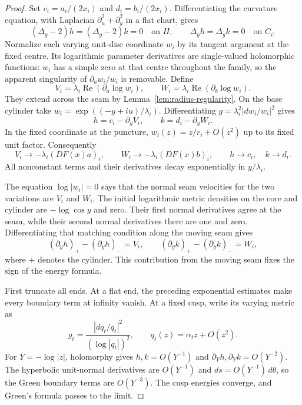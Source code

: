 \documentclass[11pt,a4paper]{article}
\theoremstyle{definition}
\begin{document}
\begin{proof}
Set $c_i=a_i/(2x_i)$ and $d_i=b_i/(2x_i)$. Differentiating the curvature equation, with Laplacian $\partial_u^2+\partial_y^2$ in a flat chart, gives
\[
 (\Delta_g-2)h=(\Delta_g-2)k=0\quad\text{on }H,
 \qquad \Delta_g h=\Delta_g k=0\quad\text{on }C_i.
\]
Normalize each varying unit-disc coordinate $w_i$ by its tangent argument at the fixed centre. Its logarithmic parameter derivatives are single-valued holomorphic functions: $w_i$ has a simple zero at that centre throughout the family, so the apparent singularity of $\partial_a w_i/w_i$ is removable. Define
\[
 V_i=\lambda_i\operatorname{Re}(\partial_a\log w_i),\qquad
 W_i=\lambda_i\operatorname{Re}(\partial_b\log w_i).
\]
They extend across the seam by Lemma~\ref{lem:radius-regularity}. On the base cylinder take
$w_i=\exp((-y+iu)/\lambda_i)$. Differentiating
$g=\lambda_i^2|dw_i/w_i|^2$ gives
\[
 h=c_i-\partial_yV_i,\qquad k=d_i-\partial_yW_i.
\]
In the fixed coordinate at the puncture, $w_i(z)=z/r_i+O(z^2)$ up to its fixed unit factor. Consequently
\[
 V_i\longrightarrow-\lambda_i(DF(x)a)_i,\qquad
 W_i\longrightarrow-\lambda_i(DF(x)b)_i,
 \qquad h\longrightarrow c_i,\quad k\longrightarrow d_i.
\]
All nonconstant terms and their derivatives decay exponentially in $y/\lambda_i$.

The equation $\log|w_i|=0$ says that the normal seam velocities for the two variations are $V_i$ and $W_i$. The initial logarithmic metric densities on the core and cylinder are $-\log\cos y$ and zero. Their first normal derivatives agree at the seam, while their second normal derivatives there are one and zero. Differentiating that matching condition along the moving seam gives
\[
 (\partial_yh)_+-(\partial_yh)_-=V_i,\qquad
 (\partial_yk)_+-(\partial_yk)_-=W_i,
\]
where $+$ denotes the cylinder. This contribution from the moving seam fixes the sign of the energy formula.

First truncate all ends. At a flat end, the preceding exponential estimates make every boundary term at infinity vanish. At a fixed cusp, write its varying metric as
\[
 g_t=\frac{|dq_t/q_t|^2}{(\log|q_t|)^2},\qquad
 q_t(z)=\alpha_tz+O(z^2).
\]
For $Y=-\log|z|$, holomorphy gives $h,k=O(Y^{-1})$ and $\partial_Yh,\partial_Yk=O(Y^{-2})$. The hyperbolic unit-normal derivatives are $O(Y^{-1})$ and $ds=O(Y^{-1})\,d\theta$, so the Green boundary terms are $O(Y^{-3})$. The cusp energies converge, and Green's formula passes to the limit.


\end{proof}
\end{document}
